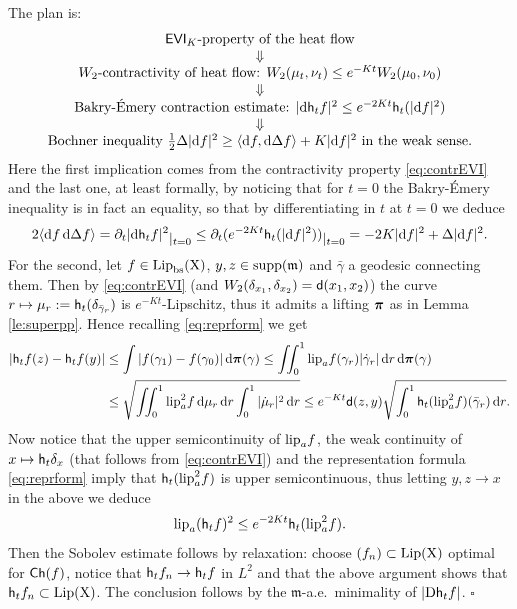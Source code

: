 \documentclass[11pt]{article}
\numberwithin{equation}{section}
\newenvironment{idea}{\removelastskip\par\medskip   %
\noindent{\em Idea of the proof} \rm}{\penalty-20\null\hfill$\square$\par\medbreak}
\newcommand{\ppi}{{\mbox{\boldmath$\pi$}}}
\newcommand{\restr}[1]{\lower3pt\hbox{$|_{#1}$}}
\newcommand{\X}{{\rm X}}
\newcommand{\sfd}{{\sf d}}
\newcommand{\mm}{{\mathfrak m}}
\newcommand{\ch}{{\sf Ch}}
\renewcommand{\d}{{\rm d}}
\newcommand{\D}{{\rm D}}
\newcommand{\lip}{{\rm lip}}
\newcommand{\Lip}{{\rm Lip}}
\newcommand{\lipa}{{\rm lip}_a}
\newcommand{\bs}{{\rm bs}}
\newcommand{\supp}{{\rm supp}}
\newcommand{\h}{{\sf h}} %
\newcommand\la{\langle}
\newcommand\ra{\rangle}
\newcommand{\EVI}{{\sf EVI}}
\begin{document}
\begin{idea}
The plan is:
\[
\begin{array}{c}
\text{$\EVI_K$-property of the heat flow}\\
{\Downarrow}\\
\text{$W_2$-contractivity of heat flow: } W_2(\mu_t,\nu_t)\leq e^{-Kt}W_2(\mu_0,\nu_0)\\
\Downarrow\\
\text{Bakry-\'Emery contraction estimate: } |\d\h_tf|^2\leq e^{-2Kt}\h_t(|\d f|^2)\\
\Downarrow\\
\text{Bochner inequality } \tfrac12\Delta|\d f|^2\geq\la\d f,\d\Delta f\ra+K|\d f|^2 \text{ in the weak sense.}
\end{array}
\]
Here the first implication comes from the contractivity property \eqref{eq:contrEVI} and the last one, at least formally, by noticing that for $t=0$ the Bakry-\'Emery inequality is in fact an equality, so that by differentiating in $t$ at $t=0$ we deduce
\[
2 \la\d f\,\d\Delta f\ra=\partial_t |\d\h_tf|^2\restr{t=0}\leq\partial_t (e^{-2Kt}\h_t(|\d f|^2))\restr{t=0}=-2K|\d f|^2+\Delta |\d f|^2.
\]
For the second, let $f\in\Lip_{\bs}(\X)$, $y,z\in\supp(\mm)$ and $\bar \gamma$ a geodesic connecting them. Then by \eqref{eq:contrEVI} (and $W_2(\delta_{x_1},\delta_{x_2})=\sfd(x_1,x_2)$) the curve $r\mapsto\mu_r:=\h_t(\delta_{\bar\gamma_r})$ is $e^{-Kt}$-Lipschitz, thus it admits a lifting $\ppi$ as in Lemma \ref{le:superpp}. Hence recalling \eqref{eq:reprform} we get
\[
\begin{split}
|\h_tf(z)-\h_t f(y)|&\leq \int|f(\gamma_1)-f(\gamma_0)|\,\d\ppi(\gamma)\leq\iint_0^1\lip_af(\gamma_r)|\dot\gamma_r| \,\d r\,\d\ppi(\gamma)\\
&\leq\sqrt{\iint_0^1\lipa^2f \,\d\mu_r\,\d r\int_0^1|\dot\mu_r|^2\,\d r}\leq e^{-Kt} \sfd(z,y) \sqrt{\int_0^1\h_t(\lip_a^2f)(\bar \gamma_r)\,\d r}.
\end{split}
\]
Now notice that the upper semicontinuity of $\lip_af$, the weak continuity of $x\mapsto \h_t\delta_x$ (that follows from  \eqref{eq:contrEVI}) and the representation formula \eqref{eq:reprform} imply that $\h_t(\lip_a^2f)$ is upper semicontinuous, thus letting $y,z\to x$ in the above we deduce 
\[
\lip_a(\h_tf)^2\leq e^{-2Kt}\h_t(\lip_a^2f).
\]
Then the Sobolev estimate follows by relaxation: choose $(f_n)\subset\Lip(\X)$ optimal for $\ch(f)$, notice that $\h_tf_n\to\h_tf$ in $L^2$ and  that the above argument shows that  $\h_tf_n\subset\Lip(\X)$. The conclusion follows by the $\mm$-a.e.\ minimality of $|\D\h_tf|$.
\end{idea}
\end{document}
